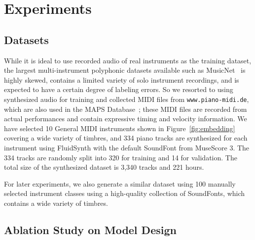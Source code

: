 \section{Experiments}\label{sec:experiments}

\subsection{Datasets}

While it is ideal to use recorded audio of real instruments as the training dataset, the largest multi-instrument polyphonic datasets available such as MusicNet~\cite{thickstun2017musicnet} is highly skewed, contains a limited variety of solo instrument recordings, and is expected to have a certain degree of labeling errors.
So we resorted to using synthesized audio for training and collected MIDI files from \texttt{www.piano-midi.de}, which are also used in the MAPS Database~\cite{emiya2010multipitch}; these MIDI files are recorded from actual performances and contain expressive timing and velocity information.
We have selected 10 General MIDI instruments shown in Figure~\ref{fig:embedding} covering a wide variety of timbres, and 334 piano tracks are synthesized for each instrument using FluidSynth with the default SoundFont from MuseScore 3.
The 334 tracks are randomly split into 320 for training and 14 for validation.
The total size of the synthesized dataset is 3,340 tracks and 221 hours.

For later experiments, we also generate a similar dataset using 100 manually selected instrument classes using a high-quality collection of SoundFonts, which contains a wide variety of timbres.


\subsection{Ablation Study on Model Design}

